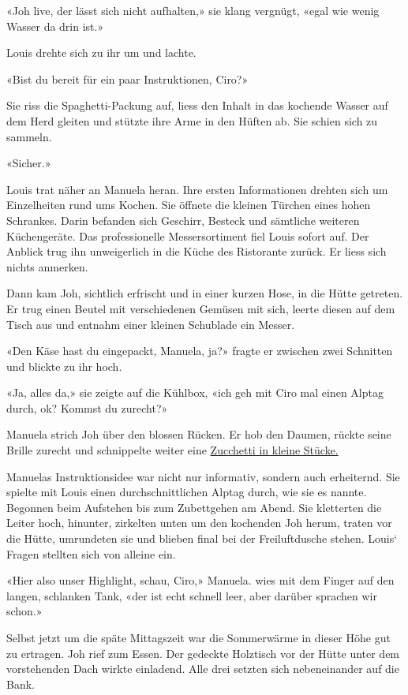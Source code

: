 «Joh live, der lässt sich nicht aufhalten,» sie klang vergnügt, «egal
wie wenig Wasser da drin ist.»

Louis drehte sich zu ihr um und lachte.

«Bist du bereit für ein paar Instruktionen, Ciro?»

Sie riss die Spaghetti-Packung auf, liess den Inhalt in das kochende
Wasser auf dem Herd gleiten und stützte ihre Arme in den Hüften ab. Sie
schien sich zu sammeln.

«Sicher.»

Louis trat näher an Manuela heran. Ihre ersten Informationen drehten
sich um Einzelheiten rund ums Kochen. Sie öffnete die kleinen Türchen
eines hohen Schrankes. Darin befanden sich Geschirr, Besteck und
sämtliche weiteren Küchengeräte. Das professionelle Messersortiment fiel
Louis sofort auf. Der Anblick trug ihn unweigerlich in die Küche des
Ristorante zurück. Er liess sich nichts anmerken.

Dann kam Joh, sichtlich erfrischt und in einer kurzen Hose, in die Hütte
getreten. Er trug einen Beutel mit verschiedenen Gemüsen mit sich,
leerte diesen auf dem Tisch aus und entnahm einer kleinen Schublade ein
Messer.

«Den Käse hast du eingepackt, Manuela, ja?» fragte er zwischen zwei
Schnitten und blickte zu ihr hoch.

«Ja, alles da,» sie zeigte auf die Kühlbox, «ich geh mit Ciro mal einen
Alptag durch, ok? Kommst du zurecht?»

Manuela strich Joh über den blossen Rücken. Er hob den Daumen, rückte
seine Brille zurecht und schnippelte weiter eine
\href{https://www.gemuese.ch/gemuesearten/zucchetti}{Zucchetti in kleine
Stücke.}

Manuelas Instruktionsidee war nicht nur informativ, sondern auch
erheiternd. Sie spielte mit Louis einen durchschnittlichen Alptag durch,
wie sie es nannte. Begonnen beim Aufstehen bis zum Zubettgehen am Abend.
Sie kletterten die Leiter hoch, hinunter, zirkelten unten um den
kochenden Joh herum, traten vor die Hütte, umrundeten sie und blieben
final bei der Freiluftdusche stehen. Louis` Fragen stellten sich von
alleine ein.

«Hier also unser Highlight, schau, Ciro,» Manuela. wies mit dem Finger
auf den langen, schlanken Tank, «der ist echt schnell leer, aber darüber
sprachen wir schon.»

Selbst jetzt um die späte Mittagszeit war die Sommerwärme in dieser Höhe
gut zu ertragen. Joh rief zum Essen. Der gedeckte Holztisch vor der
Hütte unter dem vorstehenden Dach wirkte einladend. Alle drei setzten
sich nebeneinander auf die Bank.

